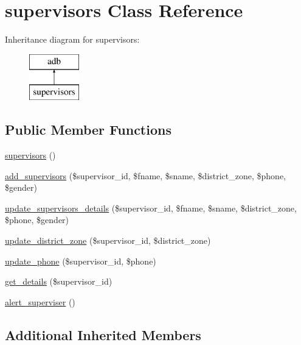 \hypertarget{classsupervisors}{}\section{supervisors Class Reference}
\label{classsupervisors}
Inheritance diagram for supervisors\+:\begin{figure}[H]
\begin{center}
\leavevmode
\includegraphics[height=2.000000cm]{classsupervisors}
\end{center}
\end{figure}
\subsection*{Public Member Functions}
\begin{DoxyCompactItemize}
\item 
\hyperlink{classsupervisors_a0bbaf94a506fbf1134f8dcf9320729f3}{supervisors} ()
\item 
\hyperlink{classsupervisors_a7fd5187e211ba102e35dc5530a635580}{add\+\_\+supervisors} (\$supervisor\+\_\+id, \$fname, \$sname, \$district\+\_\+zone, \$phone, \$gender)
\item 
\hyperlink{classsupervisors_a89cf63b6336b02ce9cc333c011821bc3}{update\+\_\+supervisors\+\_\+details} (\$supervisor\+\_\+id, \$fname, \$sname, \$district\+\_\+zone, \$phone, \$gender)
\item 
\hyperlink{classsupervisors_ab011c45eb5d3c2b00c6420c1991f4c83}{update\+\_\+district\+\_\+zone} (\$supervisor\+\_\+id, \$district\+\_\+zone)
\item 
\hyperlink{classsupervisors_aef2af2c3148dae1e1bc7f18f4e27ac3f}{update\+\_\+phone} (\$supervisor\+\_\+id, \$phone)
\item 
\hyperlink{classsupervisors_aac87181381092a85ed5ca1cf39b10957}{get\+\_\+details} (\$supervisor\+\_\+id)
\item 
\hyperlink{classsupervisors_a38022bee28625c38ee50b0d8e4f246b4}{alert\+\_\+superviser} ()
\end{DoxyCompactItemize}
\subsection*{Additional Inherited Members}


